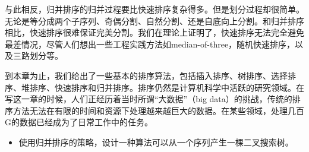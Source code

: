 \documentclass[UTF8]{article}
\begin{document}
与此相反，归并排序的归并过程要比快速排序复杂得多。但是划分过程却很简单。无论是等分成两个子序列、奇偶分割、自然分割、还是自底向上分割。和归并排序相比，快速排序很难保证完美分割。我们在理论上证明了，快速排序无法完全避免最差情况，尽管人们想出一些工程实践方法如median-of-three，随机快速排序，以及三路划分等。

到本章为止，我们给出了一些基本的排序算法，包括插入排序、树排序、选择排序、堆排序、快速排序和归并排序。排序仍然是计算机科学中活跃的研究领域。在写这一章的时候，人们正经历着当时所谓“大数据”（big data）的挑战，传统的排序方法无法在有限的时间和资源下处理越来越巨大的数据。在某些领域，处理几百G的数据已经成为了日常工作中的任务。

\begin{Exercise}
  \begin{itemize}
    \item 使用归并排序的策略，设计一种算法可以从一个序列产生一棵二叉搜索树。
  \end{itemize}
\end{Exercise}

\ifx\wholebook\relax\else
\end{document}
